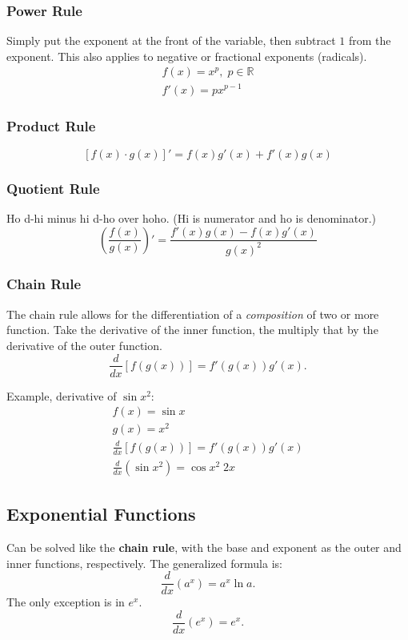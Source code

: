 \documentclass[12pt]{article}
\begin{document}
\subsubsection{Power Rule}
Simply put the exponent at the front of the variable, then subtract $1$ from the exponent. This also applies to negative or fractional exponents (radicals).
\begin{gather*}
    f(x) = x^p, \; p \in \mathbb{R} \\
    f'(x) = px^{p-1}
\end{gather*}

\subsubsection{Product Rule}
\[ \left[ f(x) \cdot g(x) \right]' = f(x)g'(x) + f'(x)g(x) \]

\subsubsection{Quotient Rule}
\noindent Ho d-hi minus hi d-ho over hoho. (Hi is numerator and ho is denominator.)
\[ \left( \frac{f(x)}{g(x)} \right)' = \frac{f'(x)g(x) - f(x)g'(x)}{g(x)^2} \]

\subsubsection{Chain Rule}
The chain rule allows for the differentiation of a \textit{composition} of two or more function. Take the derivative of the inner function, the multiply that by the derivative of the outer function.
\[ \frac{d}{dx} \left[ f \left( g(x) \right) \right] = f' \left( g(x) \right) g'(x). \]

\noindent Example, derivative of $\sin{x^2}$:
\begin{gather*}
    f(x) = \sin{x} \\
    g(x) = x^2 \\
    \frac{d}{dx} \left[ f \left( g(x) \right) \right] = f' \left( g(x) \right) g'(x) \\
    \frac{d}{dx} \left( \sin{x^2} \right) = \cos{x^2} \; 2x
\end{gather*}

\subsection{Exponential Functions}
Can be solved like the \textbf{chain rule}, with the base and exponent as the outer and inner functions, respectively. The generalized formula is:
\[ \frac{d}{dx} \left( a^x \right) = a^x \ln{a}. \]
The only exception is in $e^x$.
\[ \frac{d}{dx} \left( e^x \right) = e^x.\]
\end{document}
